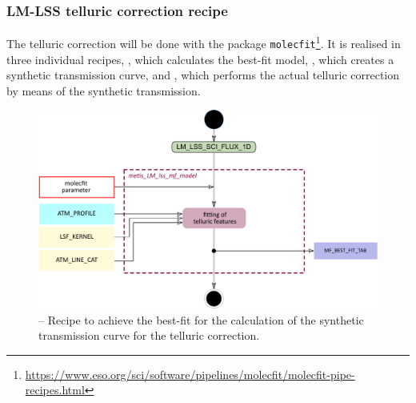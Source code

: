 \subsubsection{LM-LSS telluric correction recipe }\label{rec:metis_lm_lss_mf_model}
The telluric correction will be done with the package \texttt{molecfit}\footnote{\url{https://www.eso.org/sci/software/pipelines/molecfit/molecfit-pipe-recipes.html}}. It is realised in three individual recipes, \hyperref[rec:metis_lm_lss_mf_model]{}, which calculates the best-fit model, \hyperref[rec:metis_lm_lss_mf_calctrans]{}, which creates a synthetic transmission curve, and \hyperref[rec:metis_lm_lss_mf_correct]{}, which performs the actual telluric correction by means of the synthetic transmission.

\begin{figure}[ht]
  \centering
  \includegraphics[width=0.5\textheight]{figures/metis_lm_lss_mf_model_v0.83.pdf}
  \caption[Recipe: ]{ --
    Recipe to achieve the best-fit for the calculation of the synthetic transmission curve for the telluric correction.}
  \label{Fig:rec_lm_lss_mf_model}
\end{figure}
\clearpage


